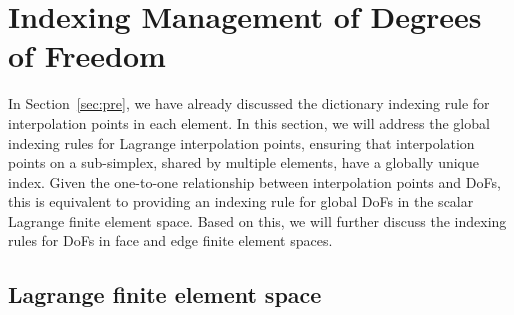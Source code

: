 \documentclass[mathpazo]{cicp}
\begin{document}



\section{Indexing Management of Degrees of Freedom}\label{sec:implementation}

In Section~\ref{sec:pre}, we have already discussed
the dictionary indexing rule for interpolation points in each element. In this
section, we will address the global indexing rules for Lagrange
interpolation points, ensuring that interpolation points on a sub-simplex,
shared by multiple elements, have a globally unique index.  Given the
one-to-one relationship between interpolation points and DoFs, this is
equivalent to providing an indexing rule for global DoFs in the scalar Lagrange
finite element space. Based on this, we will further discuss the indexing
rules for DoFs in face and edge finite element spaces.

\subsection{Lagrange finite element space}
\end{document}
